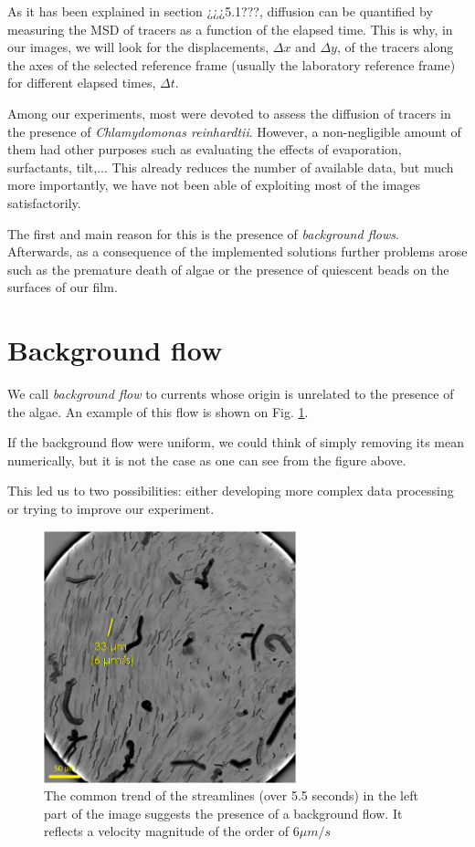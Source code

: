 As it has been explained in section ¿¿¿5.1???, diffusion can be quantified by measuring the MSD of tracers as a function of the elapsed time. This is why, in our images, we will look for the displacements, $\Delta x$ and $\Delta y$, of the tracers along the axes of the selected reference frame (usually the laboratory reference frame) for different elapsed times, $\Delta t$.

Among our experiments, most were devoted to assess the diffusion of tracers in the presence of \textit{Chlamydomonas reinhardtii}. However, a non-negligible amount of them had other purposes such as evaluating the effects of evaporation, surfactants, tilt,... This already reduces the number of available data, but much more importantly, we have not been able of exploiting most of the images satisfactorily.

The first and main reason for this is the presence of \textit{background flows}. Afterwards, as a consequence of the implemented solutions further problems arose such as the premature death of algae or the presence of quiescent beads on the surfaces of our film.

\section{Background flow}

We call \textit{background flow} to currents whose origin is unrelated to the presence of the algae. An example of this flow is shown on Fig. \ref{backg_flow}.

If the background flow were uniform, we could think of simply removing its mean numerically, but it is not the case as one can see from the figure above. 

This led us to two possibilities: either developing more complex data processing or trying to improve our experiment. 

\begin{figure}[H]
	\centering
	\includegraphics[width=0.65\textwidth]{archivos/backg_flow.png}
	\caption{The common trend of the streamlines (over 5.5 seconds) in the left part of the image suggests the presence of a background flow. It reflects a velocity magnitude of the order of $6 \mu m / s$}
	\label{backg_flow}
\end{figure}

